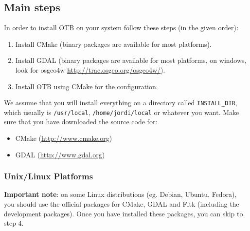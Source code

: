 \subsection{Main steps}
In order to install OTB on your system follow these steps (in the
given order):
\begin{enumerate}
  \item Install CMake (binary packages are available for most platforms).
  \item Install GDAL (binary packages are available for most platforms,
        on windows, look for osgeo4w \url{http://trac.osgeo.org/osgeo4w/}).
  \item Install OTB using CMake for the configuration.
\end{enumerate}

We assume that you will install everything on a directory called
\texttt{INSTALL\_DIR}, which usually is \texttt{/usr/local}, \texttt{/home/jordi/local} or
whatever you want. Make sure that you have downloaded the source code for:
  \begin{itemize}
  \item CMake (\url{http://www.cmake.org})
  \item GDAL (\url{http://www.gdal.org})
  \end{itemize}

\subsubsection{Unix/Linux Platforms}

\textbf{Important note}: on some Linux distributions (eg. Debian, Ubuntu, Fedora), you should use
the official packages for CMake, GDAL and Fltk (including the development packages). Once you have installed these
packages, you can skip to step 4.

